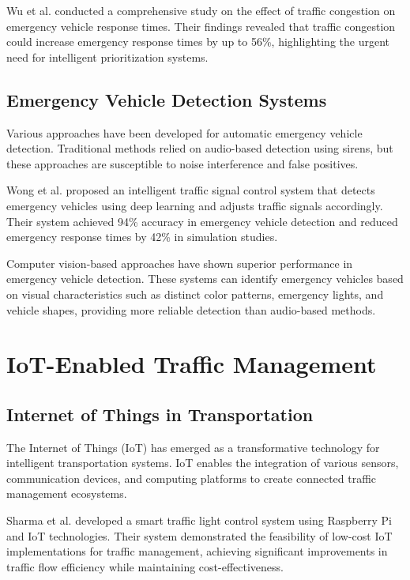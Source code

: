Wu et al. \cite{wu2014emergency} conducted a comprehensive study on the effect of traffic congestion on emergency vehicle response times. Their findings revealed that traffic congestion could increase emergency response times by up to 56\%, highlighting the urgent need for intelligent prioritization systems.

\subsection{Emergency Vehicle Detection Systems}

Various approaches have been developed for automatic emergency vehicle detection. Traditional methods relied on audio-based detection using sirens, but these approaches are susceptible to noise interference and false positives.

Wong et al. \cite{wong2020intelligent} proposed an intelligent traffic signal control system that detects emergency vehicles using deep learning and adjusts traffic signals accordingly. Their system achieved 94\% accuracy in emergency vehicle detection and reduced emergency response times by 42\% in simulation studies.

Computer vision-based approaches have shown superior performance in emergency vehicle detection. These systems can identify emergency vehicles based on visual characteristics such as distinct color patterns, emergency lights, and vehicle shapes, providing more reliable detection than audio-based methods.

\section{IoT-Enabled Traffic Management}

\subsection{Internet of Things in Transportation}

The Internet of Things (IoT) has emerged as a transformative technology for intelligent transportation systems. IoT enables the integration of various sensors, communication devices, and computing platforms to create connected traffic management ecosystems.

Sharma et al. \cite{sharma2021smart} developed a smart traffic light control system using Raspberry Pi and IoT technologies. Their system demonstrated the feasibility of low-cost IoT implementations for traffic management, achieving significant improvements in traffic flow efficiency while maintaining cost-effectiveness.

